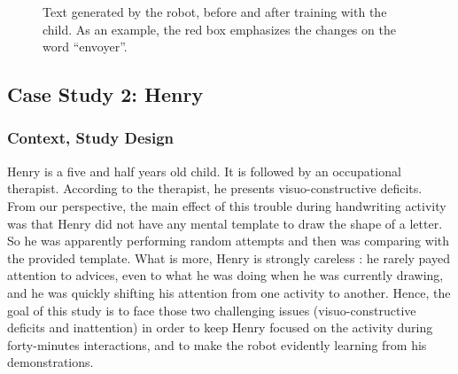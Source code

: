\documentclass{article}
\begin{document}
\begin{figure}
    \centering

    \caption{\small Text generated by the robot, before and after training with
    the child. As an example, the red box emphasizes the changes on the word
    ``envoyer''.}
    \label{fig:stimuli}
\end{figure}


\subsection{Case Study 2: Henry}

\subsubsection{Context, Study Design}
Henry is a five and half years old child. It is followed by an occupational
therapist. According to the therapist, he presents visuo-constructive deficits.
From our perspective, the main effect of this trouble during handwriting
activity was that Henry
did not have any mental template to draw the shape of a letter. So he was 
apparently performing random attempts and then was comparing with the provided template.
What is more, Henry is strongly careless : he rarely payed attention to
advices, even to what he was doing when he was currently drawing, and he was
quickly shifting his attention from one
activity to another.
Hence, the goal of this study is to face those two challenging issues
(visuo-constructive deficits and inattention) in order to keep Henry focused
on the activity during forty-minutes interactions, and to make the robot
evidently learning from his demonstrations.\\
\end{document}
